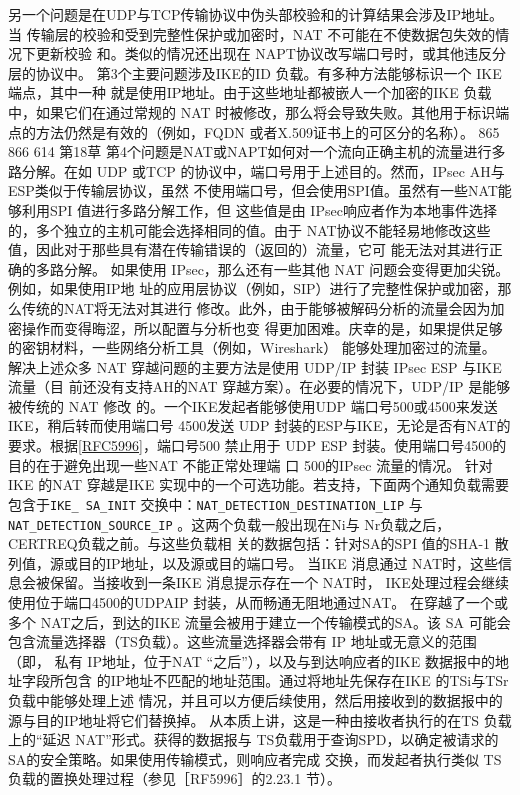 另一个问题是在UDP与TCP传输协议中伪头部校验和的计算结果会涉及IP地址。当
传输层的校验和受到完整性保护或加密时，NAT 不可能在不使数据包失效的情况下更新校验
和。类似的情况还出现在 NAPT协议改写端口号时，或其他违反分层的协议中。
第3个主要问题涉及IKE的ID 负载。有多种方法能够标识一个 IKE 端点，其中一种
就是使用IP地址。由于这些地址都被嵌人一个加密的IKE 负载中，如果它们在通过常规的
NAT 时被修改，那么将会导致失败。其他用于标识端点的方法仍然是有效的（例如，FQDN
或者X.509证书上的可区分的名称）。
865
866
614
第18草
第4个问题是NAT或NAPT如何对一个流向正确主机的流量进行多路分解。在如 UDP
或TCP 的协议中，端口号用于上述目的。然而，IPsec AH与ESP类似于传输层协议，虽然
不使用端口号，但会使用SPI值。虽然有一些NAT能够利用SPI 值进行多路分解工作，但
这些值是由 IPsec响应者作为本地事件选择的，多个独立的主机可能会选择相同的值。由于
NAT协议不能轻易地修改这些值，因此对于那些具有潜在传输错误的（返回的）流量，它可
能无法对其进行正确的多路分解。
如果使用 IPsec，那么还有一些其他 NAT 问题会变得更加尖锐。例如，如果使用IP地
址的应用层协议（例如，SIP）进行了完整性保护或加密，那么传统的NAT将无法对其进行
修改。此外，由于能够被解码分析的流量会因为加密操作而变得晦涩，所以配置与分析也变
得更加困难。庆幸的是，如果提供足够的密钥材料，一些网络分析工具（例如，Wireshark）
能够处理加密过的流量。
解决上述众多 NAT 穿越问题的主要方法是使用 UDP/IP 封装 IPsec ESP 与IKE流量（目
前还没有支持AH的NAT 穿越方案）。在必要的情况下，UDP/IP 是能够被传统的 NAT 修改
的。一个IKE发起者能够使用UDP 端口号500或4500来发送IKE，稍后转而使用端口号
4500发送 UDP 封装的ESP与IKE，无论是否有NAT的要求。根据\href{https://www.rfc-editor.org/rfc/rfc5996}{[RFC5996]}，端口号500
禁止用于 UDP ESP 封装。使用端口号4500的目的在于避免出现一些NAT 不能正常处理端
口 500的IPsec 流量的情况。
针对 IKE 的NAT 穿越是IKE 实现中的一个可选功能。若支持，下面两个通知负载需要
包含于\verb|IKE_ SA_INIT| 交换中：\verb|NAT_DETECTION_DESTINATION_LIP| 与 \verb|NAT_DETECTION_SOURCE_IP|
。这两个负载一般出现在Ni与 Nr负载之后，CERTREQ负载之前。与这些负载相
关的数据包括：针对SA的SPI 值的SHA-1 散列值，源或目的IP地址，以及源或目的端口号。
当IKE 消息通过 NAT时，这些信息会被保留。当接收到一条IKE 消息提示存在一个 NAT时，
IKE处理过程会继续使用位于端口4500的UDPAIP 封装，从而畅通无阻地通过NAT。
在穿越了一个或多个 NAT之后，到达的IKE 流量会被用于建立一个传输模式的SA。该
SA 可能会包含流量选择器（TS负载）。这些流量选择器会带有 IP 地址或无意义的范围（即，
私有 IP地址，位于NAT “之后”），以及与到达响应者的IKE 数据报中的地址字段所包含
的IP地址不匹配的地址范围。通过将地址先保存在IKE 的TSi与TSr负载中能够处理上述
情况，并且可以方便后续使用，然后用接收到的数据报中的源与目的IP地址将它们替换掉。
从本质上讲，这是一种由接收者执行的在TS 负载上的“延迟 NAT”形式。获得的数据报与
TS负载用于查询SPD，以确定被请求的SA的安全策略。如果使用传输模式，则响应者完成
交换，而发起者执行类似 TS负载的置换处理过程（参见［RF5996］的2.23.1 节）。

